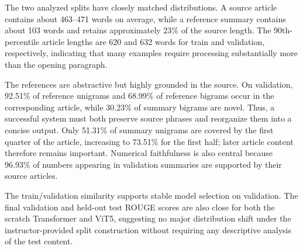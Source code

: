 \documentclass[conference]{IEEEtran}
\begin{document}
The two analyzed splits have closely matched distributions. A source article contains about 463--471 words on average, while a reference summary contains about 103 words and retains approximately 23\% of the source length. The 90th-percentile article lengths are 620 and 632 words for train and validation, respectively, indicating that many examples require processing substantially more than the opening paragraph.

\begin{table}[htbp]
\centering
\caption{Article--summary characteristics on train and validation.}
\label{tab:dataset_overlap}
\end{table}

The references are abstractive but highly grounded in the source. On validation, 92.51\% of reference unigrams and 68.99\% of reference bigrams occur in the corresponding article, while 30.23\% of summary bigrams are novel. Thus, a successful system must both preserve source phrases and reorganize them into a concise output. Only 51.31\% of summary unigrams are covered by the first quarter of the article, increasing to 73.51\% for the first half; later article content therefore remains important. Numerical faithfulness is also central because 96.93\% of numbers appearing in validation summaries are supported by their source articles.

The train/validation similarity supports stable model selection on validation. The final validation and held-out test ROUGE scores are also close for both the scratch Transformer and ViT5, suggesting no major distribution shift under the instructor-provided split construction without requiring any descriptive analysis of the test content.
\end{document}

